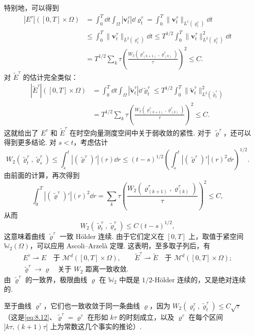 特别地，可以得到
\[
\begin{aligned}
|E^\tau|([0,T]\times\Omega)
&=\int_0^T\dd t\int_\Omega|\mathbf v_t^\tau|\dd\varrho_t^\tau
=\int_0^T\|\mathbf v_t^\tau\|_{L^1(\varrho_t^\tau)}\dd t\\
&\leq\int_0^T\|\mathbf v_t^\tau\|_{L^2(\varrho_t^\tau)}\dd t
\leq T^{1/2}\int_0^T\|\mathbf v_t^\tau\|_{L^2(\varrho_t^\tau)}^2\dd t\\
&=T^{1/2}\sum_k\tau\left(\frac{W_2(\varrho_{(k+1)}^\tau,\varrho_{(k)}^\tau)}\tau\right)^2\leq C.
\end{aligned}
\]
对 $\widetilde E^\tau$ 的估计完全类似：
\[
\begin{aligned}
|\widetilde E^\tau|([0,T]\times\Omega)
&=\int_0^T\dd t\int_\Omega|\widetilde{\mathbf v}_t^\tau|\dd\widetilde\varrho_t^\tau
\leq T^{1/2}\int_0^T\|\widetilde{\mathbf v}_t^\tau\|_{L^2(\widetilde\varrho_t^\tau)}^2\\
&=T^{1/2}\sum_k\tau\left(\frac{W_2(\varrho_{(k+1)}^\tau,\varrho_{(k)}^\tau)}\tau\right)^2\leq C.
\end{aligned}
\]
这就给出了 $E^\tau$ 和 $\widetilde E^\tau$ 在时空向量测度空间中关于弱收敛的紧性. 对于 $\widetilde\varrho^\tau$，还可以得到更多结论. 对 $s<t$，考虑估计
\[
W_2(\widetilde\varrho_t^\tau,\widetilde\varrho_s^\tau)
\leq\int_s^t|(\widetilde\varrho^\tau)'|(r)\dd r
\leq(t-s)^{1/2}\left(\int_s^t|(\widetilde\varrho^\tau)'|(r)^2\dd r\right)^{1/2}.
\]
由前面的计算，再次得到
\[
\int_0^T|(\widetilde\varrho^\tau)'|(r)^2\dd r
=\sum_k\tau\left(\frac{W_2(\varrho_{(k+1)}^\tau,\varrho_{(k)}^\tau)}\tau\right)^2\leq C,
\]
从而
\begin{equation}\label{eq:8.12}
W_2(\widetilde\varrho_t^\tau,\widetilde\varrho_s^\tau)\leq C(t-s)^{1/2},
\end{equation}
这意味着曲线 $\widetilde\varrho^\tau$ 一致 Hölder 连续. 由于它们定义在 $[0,T]$ 上，取值于紧空间 $\mathbb W_2(\Omega)$，可以应用 Ascoli--Arzel\`a 定理. 这表明，至多取子列后，有
\[
\begin{gathered}
E^\tau\rightharpoonup E\quad\text{于 }\mathscr M^d([0,T]\times\Omega),\qquad
\widetilde E^\tau\rightharpoonup\widetilde E\quad\text{于 }\mathscr M^d([0,T]\times\Omega);\\
\widetilde\varrho^\tau\to\varrho\quad\text{关于 }W_2\text{ 距离一致收敛}.
\end{gathered}
\]
由 $\widetilde\varrho^\tau$ 的一致界，极限曲线 $\varrho$ 在 $\mathbb W_2$ 中既是 $1/2$-Hölder 连续的，又是绝对连续的.

至于曲线 $\varrho^\tau$，它们也一致收敛于同一条曲线 $\varrho$，因为 $W_2(\varrho_t^\tau,\widetilde\varrho_t^\tau)\leq C\sqrt\tau$（这是\eqref{eq:8.12}、$\widetilde\varrho^\tau=\varrho^\tau$ 在形如 $k\tau$ 的时刻成立，以及 $\varrho^\tau$ 在每个区间 $]k\tau,(k+1)\tau]$ 上为常数这几个事实的推论）.

